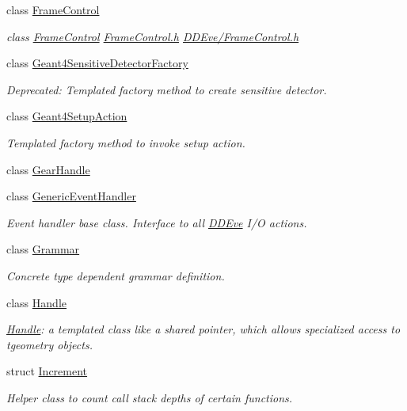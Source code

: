\begin{DoxyCompactItemize}
class \hyperlink{class_d_d4hep_1_1_frame_control}{Frame\+Control}
\begin{DoxyCompactList}\small\item\em class \hyperlink{class_d_d4hep_1_1_frame_control}{Frame\+Control} \hyperlink{_frame_control_8h}{Frame\+Control.\+h} \hyperlink{_frame_control_8h}{D\+D\+Eve/\+Frame\+Control.\+h} \end{DoxyCompactList}\item 
class \hyperlink{class_d_d4hep_1_1_geant4_sensitive_detector_factory}{Geant4\+Sensitive\+Detector\+Factory}
\begin{DoxyCompactList}\small\item\em Deprecated\+: Templated factory method to create sensitive detector. \end{DoxyCompactList}\item 
class \hyperlink{class_d_d4hep_1_1_geant4_setup_action}{Geant4\+Setup\+Action}
\begin{DoxyCompactList}\small\item\em Templated factory method to invoke setup action. \end{DoxyCompactList}\item 
class \hyperlink{class_d_d4hep_1_1_gear_handle}{Gear\+Handle}
\item 
class \hyperlink{class_d_d4hep_1_1_generic_event_handler}{Generic\+Event\+Handler}
\begin{DoxyCompactList}\small\item\em Event handler base class. Interface to all \hyperlink{struct_d_d4hep_1_1_d_d_eve}{D\+D\+Eve} I/O actions. \end{DoxyCompactList}\item 
class \hyperlink{class_d_d4hep_1_1_grammar}{Grammar}
\begin{DoxyCompactList}\small\item\em Concrete type dependent grammar definition. \end{DoxyCompactList}\item 
class \hyperlink{class_d_d4hep_1_1_handle}{Handle}
\begin{DoxyCompactList}\small\item\em \hyperlink{class_d_d4hep_1_1_handle}{Handle}\+: a templated class like a shared pointer, which allows specialized access to tgeometry objects. \end{DoxyCompactList}\item 
struct \hyperlink{struct_d_d4hep_1_1_increment}{Increment}
\begin{DoxyCompactList}\small\item\em Helper class to count call stack depths of certain functions. \end{DoxyCompactList}\item 

\end{DoxyCompactItemize}
